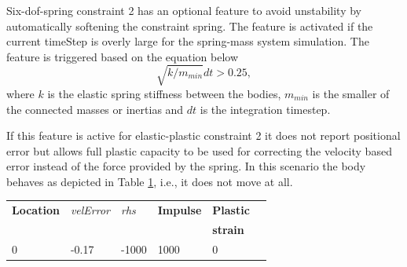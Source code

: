 \begin{table}
\label{tab:epBlockValues} 
\end {table}

Six-dof-spring constraint 2 has an optional feature to avoid unstability by automatically softening the constraint
spring. The feature is activated if the current timeStep is overly large for the spring-mass system simulation.
The feature is triggered based on the equation below 
\begin{equation} \label{eq:frequencyLimited}
\sqrt{ k /  m_{min}} dt > 0.25, 
\end{equation}
where $k$ is the elastic spring stiffness between the bodies,
$m_{min}$ is the smaller of the connected masses or inertias and $dt$ is the integration timestep.

If this feature is active for elastic-plastic constraint 2   
it does not report positional error but  allows full plastic capacity to be used for correcting
the velocity based error instead of the force provided by the spring.
In this scenario the body behaves as depicted in Table \ref{tab:ep2BlockValues}, i.e., it does not move at all.

\begin{table}
 {
\begin{tabular}{|l| l| l|l|l|l|}
\hline
{\bf Location} &
{\it velError} &  {\it rhs} &
{\bf Impulse} & 
{\bf Plastic } \\ 
 & & & &{\bf strain}\\
\hline
 0 & -0.17  & -1000  & 1000 & 0 \\  \hline
\end {tabular}}
\label{tab:ep2BlockValues} 
\end {table}

